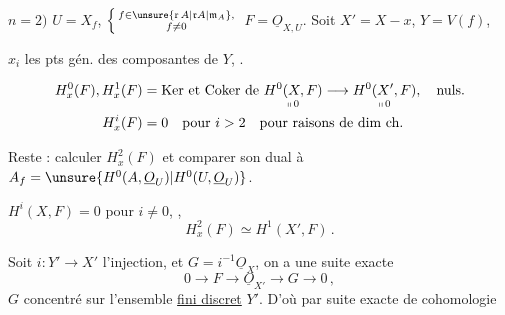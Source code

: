 $n=2)$ \qquad $U=X_f$, $\left\{\begin{smallmatrix}f\in\unsure{\operatorname{r}A|\mathfrak r A|\mathfrak m_A},\\ f\ne0\end{smallmatrix}\right.$ \qquad $F=\underline O_{X,U}$. Soit $X'=X-x$, $Y=V(f)$,  

$x_i$ les pts gén. des composantes de $Y$, \unsure{\ldots}.

\[
\begin{aligned}
H_x^0(F),H_x^1(F)&=\text{Ker et Coker de }\underset{\shortparallel\,0}{H^0(X,F)}
 \longrightarrow\underset{\shortparallel\,0}{H^0(X',F)},\quad\text{nuls}.\\
H_x^i(F)&=0\quad\text{pour }i>2\quad\text{pour raisons de dim ch.}
\end{aligned}
\]

Reste : calculer $H_x^2(F)$ et comparer son dual à $A_f=\unsure{H^0(A,\underline O_U)|H^0(U,\underline O_U)}$.

   $H^i(X,F)=0$ pour  $i\ne0$, ,
\[
H_x^2(F)\simeq H^1(X',F)\,.
\]

Soit  $i:Y'\longrightarrow X'$ l'injection, et $G=i^{-1}\underline O_X$, on a une suite exacte
\[
0\longrightarrow F\longrightarrow\underline O_{X'}\longrightarrow G\longrightarrow0\,,
\]
$G$ concentré sur l'ensemble \uline{fini discret} $Y'$. D'où par suite exacte de cohomologie



